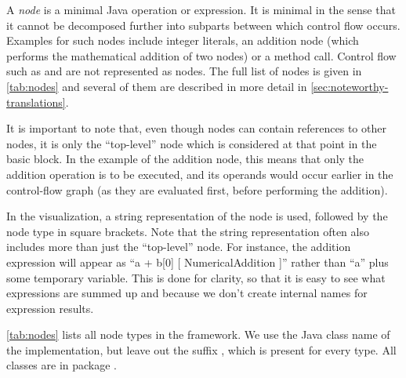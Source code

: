 \begin{definition}[Nodes]
    \label{def:node}
    A \emph{node} is a minimal Java operation or expression.  It is
    minimal in the sense that it cannot be decomposed further into
    subparts between which control flow occurs. Examples for such
    nodes include integer literals, an addition node (which performs
    the mathematical addition of two nodes) or a method call.  Control
    flow such as  and  are not represented as
    nodes.  The full list of nodes is given in \autoref{tab:nodes} and
    several of them are described in more detail in
    \autoref{sec:noteworthy-translations}.

    It is important to note that, even though nodes can contain
    references to other nodes, it is only the ``top-level'' node which
    is considered at that point in the basic block. In the example of
    the addition node, this means that only the addition operation is
    to be executed, and its operands would occur earlier in the
    control-flow graph (as they are evaluated first, before performing
    the addition).
\end{definition}

In the visualization, a string representation of the node is used,
followed by the node type in square brackets. Note that the string
representation often also includes more than just the ``top-level''
node. For instance, the addition expression  will
appear as ``a + b[0] [ NumericalAddition ]'' rather than ``a'' plus
some temporary variable.  This is done for clarity, so that it is easy
to see what expressions are summed up and because we don't create
internal names for expression results.

\autoref{tab:nodes} lists all node types in the framework. We use the
Java class name of the implementation, but leave out the suffix
, which is present for every type.
All classes are in package .

